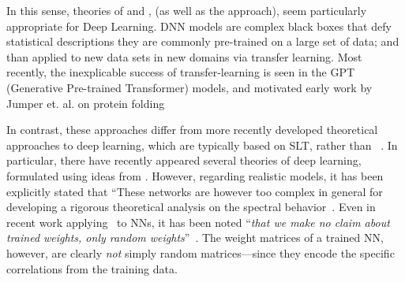  In this sense, \SemiEmpirical theories of \NuclearPhysics and \QuantumChemistry,
 (as well as the \RenormalizationGroup approach),  seem particularly appropriate
  for Deep Learning.
  DNN models are complex black boxes that defy statistical descriptions  they are commonly pre-trained on a large set of data; and than applied to new data sets in new domains via transfer learning.
  Most recently, the inexplicable success of transfer-learning is seen
in the GPT (Generative Pre-trained Transformer) models\cite{Radford2018},
and motivated early work by Jumper et. al. on protein folding\cite{JKS16_TR}

In contrast, these \SemiEmpirical approaches differ from more
recently developed theoretical approaches to deep learning, which are typically based on SLT, rather than \STATMECH~\cite{Roberts2021}.
In particular, there have recently appeared several theories of deep learning, formulated using ideas from \RMT.
However, regarding realistic models, it has been explicitly stated that
``These networks are however too complex in general for developing a rigorous theoretical analysis on the spectral behavior~\cite{LBNx17_TR}.
Even in recent work applying \RMT~to NNs, it has been noted
``\emph{that we make no claim about trained weights, only random weights}''~\cite{Yang2021}.
The weight matrices of a trained NN, however, are clearly \emph{not} simply random matrices---since they encode the specific correlations from the training data.


%
